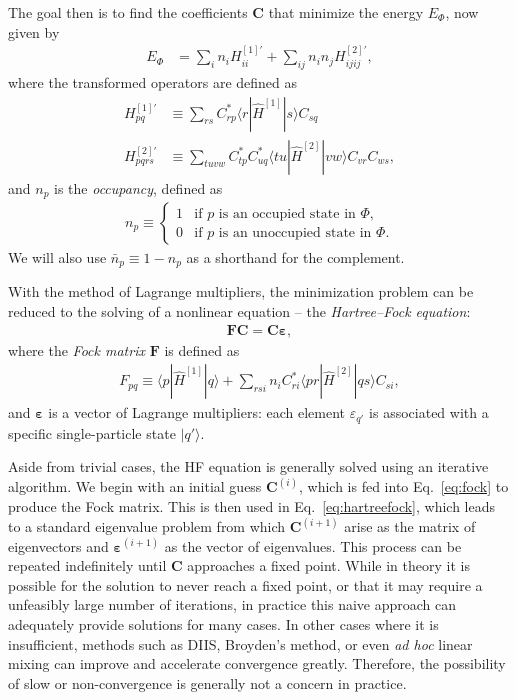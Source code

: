 The goal then is to find the coefficients $\bm C$ that minimize the energy $E_{\Phi}$, now given by
\begin{align}
  E_{\Phi} &= \sum_i n_i H^{[1] \prime}_{ii} + \sum_{ij} n_i n_j H^{[2] \prime}_{ijij} \label{eq:hfenergy},
\end{align}
where the transformed operators are defined as
\begin{align}
  H^{[1] \prime}_{pq} &\equiv \sum_{rs} C_{rp}^* \langle r | \hat{H}^{[1]} | s \rangle C_{sq}^{} \label{eq:hftransform1} \\
  H^{[2] \prime}_{pqrs} &\equiv \sum_{tuvw} C_{tp}^* C_{uq}^* \langle tu | \hat{H}^{[2]} | vw \rangle C_{vr}^{} C_{ws}^{}, \label{eq:hftransform2}
\end{align}
and $n_p$ is the \textit{occupancy}, defined as
\begin{align}
  n_p \equiv \begin{cases}
    1 & \text{if $p$ is an occupied state in $\Phi$}, \\
    0 & \text{if $p$ is an unoccupied state in $\Phi$}.
  \end{cases}
\end{align}
We will also use $\bar n_p \equiv 1 - n_p$ as a shorthand for the complement.

With the method of Lagrange multipliers, the minimization problem can
be reduced to the solving of a nonlinear equation --
the \textit{Hartree--Fock equation}:
\begin{align} \label{eq:hartreefock}
  \bm{F} \bm{C} = \bm{C} \bm{\varepsilon},
\end{align}
where the \textit{Fock matrix} $\bm F$ is defined as
\begin{align} \label{eq:fock}
  F_{pq} \equiv \langle p | \hat{H}^{[1]} | q \rangle + \sum_{rsi} n_i C_{ri}^* \langle pr | \hat{H}^{[2]} | qs \rangle C_{si}^{},
\end{align}
and $\bm{\varepsilon}$ is a vector of Lagrange multipliers: each element $\varepsilon_{q'}$ is associated with a specific single-particle state $|q'\rangle$.

Aside from trivial cases, the HF equation is generally solved using an
iterative algorithm.  We begin with an initial guess $\bm{C}^{(i)}$,
which is fed into Eq.~\eqref{eq:fock} to produce the Fock matrix.  This is
then used in Eq.~\eqref{eq:hartreefock}, which leads to a standard
eigenvalue problem from which $\bm{C}^{(i + 1)}$ arise as the matrix
of eigenvectors and $\bm{\varepsilon}^{(i + 1)}$ as the vector of
eigenvalues.  This process can be repeated indefinitely until $\bm{C}$
approaches a fixed point.  While in theory it is possible for the
solution to never reach a fixed point, or that it may require a
unfeasibly large number of iterations, in practice this naive approach
can adequately provide solutions for many cases.  In other cases where
it is insufficient, methods such as DIIS, Broyden's method, or
even \textit{ad hoc} linear mixing can improve and accelerate
convergence greatly.  Therefore, the possibility of slow or
non-convergence is generally not a concern in practice.

